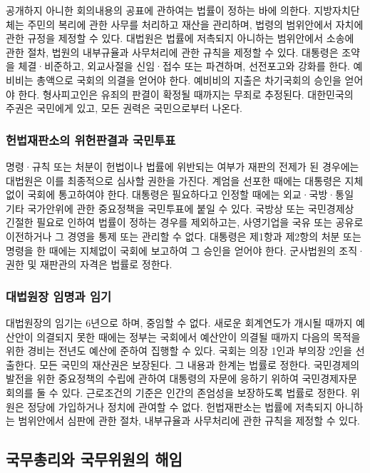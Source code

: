 \documentclass[master, korean]{pnuthesis}
\begin{document}
공개하지 아니한 회의내용의 공표에 관하여는 법률이 정하는 바에 의한다. 지방자치단체는 주민의 복리에 관한 사무를 처리하고 재산을 관리하며, 법령의 범위안에서 자치에 관한 규정을 제정할 수 있다. 대법원은 법률에 저촉되지 아니하는 범위안에서 소송에 관한 절차, 법원의 내부규율과 사무처리에 관한 규칙을 제정할 수 있다. 대통령은 조약을 체결·비준하고, 외교사절을 신임·접수 또는 파견하며, 선전포고와 강화를 한다. 예비비는 총액으로 국회의 의결을 얻어야 한다. 예비비의 지출은 차기국회의 승인을 얻어야 한다. 형사피고인은 유죄의 판결이 확정될 때까지는 무죄로 추정된다. 대한민국의 주권은 국민에게 있고, 모든 권력은 국민으로부터 나온다.

\subsubsection{헌법재판소의 위헌판결과 국민투표}

명령·규칙 또는 처분이 헌법이나 법률에 위반되는 여부가 재판의 전제가 된 경우에는 대법원은 이를 최종적으로 심사할 권한을 가진다. 계엄을 선포한 때에는 대통령은 지체없이 국회에 통고하여야 한다. 대통령은 필요하다고 인정할 때에는 외교·국방·통일 기타 국가안위에 관한 중요정책을 국민투표에 붙일 수 있다. 국방상 또는 국민경제상 긴절한 필요로 인하여 법률이 정하는 경우를 제외하고는, 사영기업을 국유 또는 공유로 이전하거나 그 경영을 통제 또는 관리할 수 없다. 대통령은 제1항과 제2항의 처분 또는 명령을 한 때에는 지체없이 국회에 보고하여 그 승인을 얻어야 한다. 군사법원의 조직·권한 및 재판관의 자격은 법률로 정한다.

\subsubsection{대법원장 임명과 임기}

대법원장의 임기는 6년으로 하며, 중임할 수 없다. 새로운 회계연도가 개시될 때까지 예산안이 의결되지 못한 때에는 정부는 국회에서 예산안이 의결될 때까지 다음의 목적을 위한 경비는 전년도 예산에 준하여 집행할 수 있다. 국회는 의장 1인과 부의장 2인을 선출한다. 모든 국민의 재산권은 보장된다. 그 내용과 한계는 법률로 정한다. 국민경제의 발전을 위한 중요정책의 수립에 관하여 대통령의 자문에 응하기 위하여 국민경제자문회의를 둘 수 있다. 근로조건의 기준은 인간의 존엄성을 보장하도록 법률로 정한다. 위원은 정당에 가입하거나 정치에 관여할 수 없다. 헌법재판소는 법률에 저촉되지 아니하는 범위안에서 심판에 관한 절차, 내부규율과 사무처리에 관한 규칙을 제정할 수 있다.

\subsection{국무총리와 국무위원의 해임}
\end{document}
